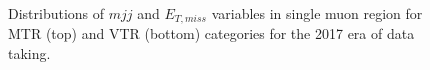 \begin{figure}[htbp]
{    }
  \caption{Distributions of $mjj$ and $E_{T,miss}$ variables in single muon region for MTR (top) and VTR (bottom) categories for the 2017 era of data taking.}
  \label{fig:2017_Wmunu_1}
\end{figure}

